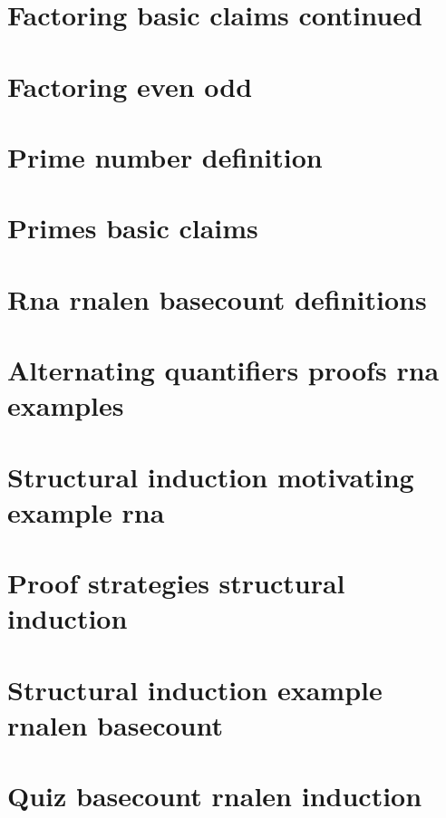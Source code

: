 \section*{Factoring basic claims continued}

\vfill
\section*{Factoring even odd}

\vfill
\section*{Prime number definition}

\vfill
\section*{Primes basic claims}

\vfill
\section*{Rna rnalen basecount definitions}

\vfill
\section*{Alternating quantifiers proofs rna examples}

\vfill
\section*{Structural induction motivating example rna}

\vfill
\section*{Proof strategies structural induction}

\vfill
\section*{Structural induction example rnalen basecount}

\vfill
\section*{Quiz basecount rnalen induction}

\vfill
